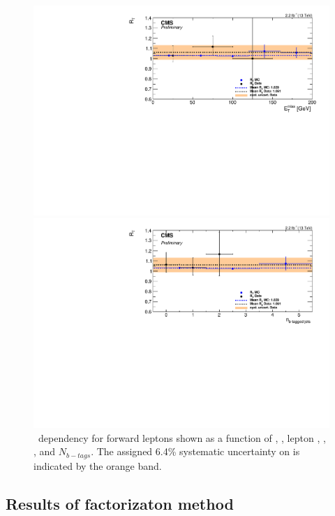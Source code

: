 \begin{figure}[htbp]
\begin{minipage}[t]{0.3\textwidth}
    \includegraphics[width=\textwidth]{bkgd/figs/Triggereff_SFvsOF_Syst_PFHT_HighHTExclusiveForward_Run2015_25ns_MET_None_NonIso_MC.pdf}
  \end{minipage}
  \begin{minipage}[t]{0.3\textwidth}
    \includegraphics[width=\textwidth]{bkgd/figs/Triggereff_SFvsOF_Syst_PFHT_HighHTExclusiveForward_Run2015_25ns_NBJets_None_NonIso_MC.pdf}
  \end{minipage}
  \caption{
    \rt\ dependency for forward leptons shown as a function of \nj, \nvtx, lepton \pt, \mll, \MET, and $N_{b-tags}$.
    The assigned 6.4\% systematic uncertainty on \rt is indicated by the orange band.
  }
  \label{fig:EffDependencyEndcap}
\end{figure}

\subsection{Results of factorizaton method}

